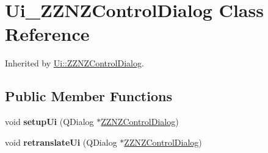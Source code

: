 \hypertarget{class_ui___z_z_n_z_control_dialog}{}\section{Ui\+\_\+\+Z\+Z\+N\+Z\+Control\+Dialog Class Reference}
\label{class_ui___z_z_n_z_control_dialog}


Inherited by \mbox{\hyperlink{class_ui_1_1_z_z_n_z_control_dialog}{Ui\+::\+Z\+Z\+N\+Z\+Control\+Dialog}}.

\subsection*{Public Member Functions}
\begin{DoxyCompactItemize}
\item 
\mbox{\label{class_ui___z_z_n_z_control_dialog_a35a23f2b0ecd3436d2cede71de3cadef}} 
void {\bfseries setup\+Ui} (Q\+Dialog $\ast$\mbox{\hyperlink{class_z_z_n_z_control_dialog}{Z\+Z\+N\+Z\+Control\+Dialog}})
\item 
\mbox{\label{class_ui___z_z_n_z_control_dialog_ab2d74ab8c7f25e475eb7443d81a9e866}} 
void {\bfseries retranslate\+Ui} (Q\+Dialog $\ast$\mbox{\hyperlink{class_z_z_n_z_control_dialog}{Z\+Z\+N\+Z\+Control\+Dialog}})
\end{DoxyCompactItemize}
